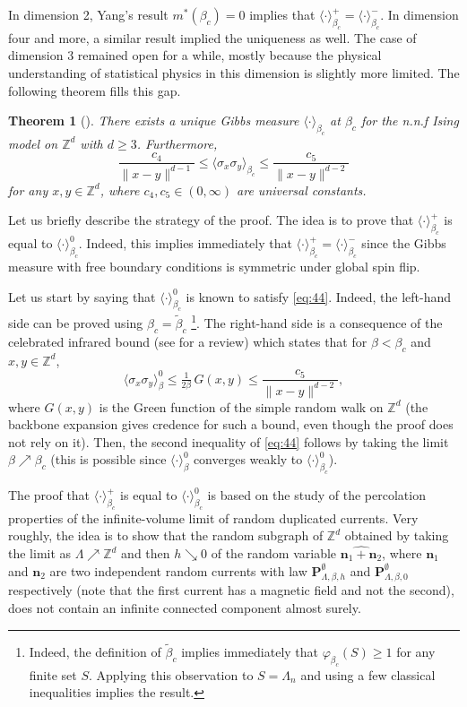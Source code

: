 \documentclass[a4paper,oneside,11pt]{article}
\newtheorem{theorem}{Theorem}[section]
\newcommand{\ee}{\end{equation}}
\newcommand{\be}{\begin{equation}}
\begin{document}
In dimension 2, Yang's result $m^*(\beta_c)=0$ implies that $\langle\cdot\rangle_{\beta_c}^+=\langle\cdot\rangle_{\beta_c}^-$. In dimension four and more, a similar result \cite{AizFer86} implied the uniqueness as well. The case of dimension 3 remained open for a while, mostly because the physical understanding of statistical physics in this dimension is slightly more limited. The following theorem fills this gap.


\begin{theorem}[\cite{AizDumSid15}]\label{thm:continuous}
There exists a unique Gibbs measure $\langle\cdot\rangle_{\beta_c}$ at $\beta_c$ for the n.n.f Ising model on $\mathbb Z^d$ with $d\ge3$. Furthermore, 
\be\label{eq:44}\frac{c_4}{\|x-y\|^{d-1}}\le \langle\sigma_x\sigma_y\rangle_{\beta_c}\le \frac{c_5}{\|x-y\|^{d-2}}\ee
for any $x,y\in\mathbb Z^d$, where $c_4,c_5\in(0,\infty)$ are universal constants.
\end{theorem}

Let us briefly describe the strategy of the proof. The idea is to prove that $\langle\cdot\rangle_{\beta_c}^+$ is equal to $\langle\cdot\rangle_{\beta_c}^0$. Indeed, this implies immediately that $\langle\cdot\rangle_{\beta_c}^+=\langle\cdot\rangle_{\beta_c}^-$ since the Gibbs measure with free boundary conditions is symmetric under global spin flip.

Let us start by saying that $\langle\cdot\rangle^0_{\beta_c}$ is known to satisfy \eqref{eq:44}. Indeed, the left-hand side can be proved using $\beta_c=\tilde\beta_c$ \footnote{Indeed, the definition of $\tilde\beta_c$ implies immediately that $\varphi_{\beta_c}(S)\ge1$ for any finite set $S$. Applying this observation to $S=\Lambda_n$ and using a few classical inequalities implies the result.}. The right-hand side is a consequence of the celebrated infrared bound (see \cite{Bis09} for a review) which states that for $\beta<\beta_c$ and $x,y\in \mathbb Z^d$,
\be\label{eq:IB}\langle\sigma_x\sigma_y\rangle_{\beta}^0\le \tfrac{1}{2\beta}\,G(x,y)\le \frac{c_5}{\|x-y\|^{d-2}},\ee
where $G(x,y)$ is the Green function of the simple random walk on $\mathbb Z^d$ (the backbone expansion gives credence for such a bound, even though the proof does not rely on it). Then, the second inequality of \eqref{eq:44} follows by taking the limit $\beta\nearrow\beta_c$ (this is possible since $\langle\cdot\rangle_{\beta}^0$ converges weakly to $\langle\cdot\rangle_{\beta_c}^0$).

The proof that $\langle\cdot\rangle_{\beta_c}^+$ is equal to $\langle\cdot\rangle_{\beta_c}^0$ is based on the study of the percolation properties of the infinite-volume limit of random duplicated currents. Very roughly, the idea is to show that the random subgraph of $\mathbb Z^d$ obtained by taking the limit as $\Lambda\nearrow \mathbb Z^d$ and then $h\searrow 0$ of the random variable $\widehat{\mathbf n_1+\mathbf n_2}$, where $\mathbf n_1$ and $\mathbf n_2$ are two independent random currents with law $\mathbf P^\emptyset_{\Lambda,\beta,h}$ and $\mathbf P^\emptyset_{\Lambda,\beta,0}$ respectively (note that the first current has a magnetic field and not the second), does not contain an infinite connected component almost surely. 
\end{document}
